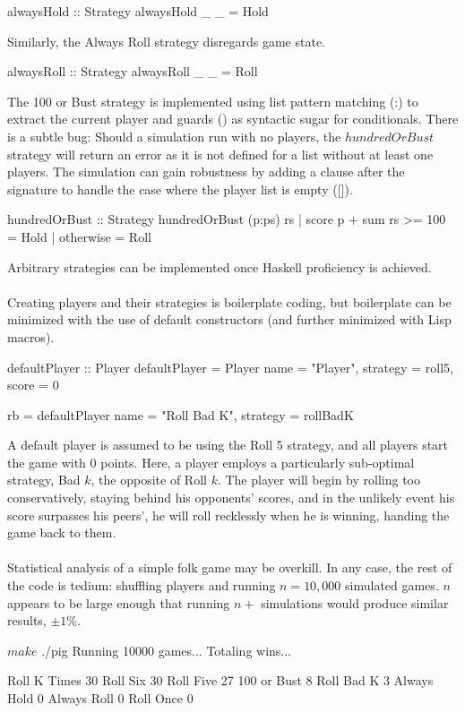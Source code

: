 \documentclass{article}
\begin{document}
\begin{verbatimtab}
alwaysHold :: Strategy
alwaysHold _ _ = Hold
\end{verbatimtab}
Similarly, the Always Roll strategy disregards game state.
\begin{verbatimtab}
alwaysRoll :: Strategy
alwaysRoll _ _ = Roll
\end{verbatimtab}
The 100 or Bust strategy is implemented using list pattern matching (:) to extract the current player and guards (\textbar) as syntactic sugar for conditionals. There is a subtle bug: Should a simulation run with no players, the $hundredOrBust$ strategy will return an error as it is not defined for a list without at least one players. The simulation can gain robustness by adding a clause after the signature to handle the case where the player list is empty ([]).
\begin{verbatimtab}
hundredOrBust :: Strategy
hundredOrBust (p:ps) rs
  | score p + sum rs >= 100 = Hold
  | otherwise = Roll
\end{verbatimtab}
Arbitrary strategies can be implemented once Haskell proficiency is achieved.
\\\\
Creating players and their strategies is boilerplate coding, but boilerplate can be minimized with the use of default constructors (and further minimized with Lisp macros).
\begin{verbatimtab}
defaultPlayer :: Player
defaultPlayer = Player {
  name = "Player",
  strategy = roll5,
  score = 0
  }

rb = defaultPlayer { name = "Roll Bad K", strategy = rollBadK }
\end{verbatimtab}
A default player is assumed to be using the Roll 5 strategy, and all players start the game with 0 points. Here, a player employs a particularly sub-optimal strategy, Bad $k$, the opposite of Roll $k$. The player will begin by rolling too conservatively, staying behind his opponents' scores, and in the unlikely event his score surpasses his peers', he will roll recklessly when he is winning, handing the game back to them.
\\\\
Statistical analysis of a simple folk game may be overkill. In any case, the rest of the code is tedium: shuffling players and running $n = 10,000$ simulated games. $n$ appears to be large enough that running $n+$ simulations would produce similar results, $\pm 1\%$.
\begin{verbatimtab}
$ make
$ ./pig
Running 10000 games...
Totaling wins...

Roll K Times  30%
Roll Six  30%
Roll Five 27%
100 or Bust 8%
Roll Bad K  3%
Always Hold 0%
Always Roll 0%
Roll Once 0%
\end{verbatimtab}
\end{document}
